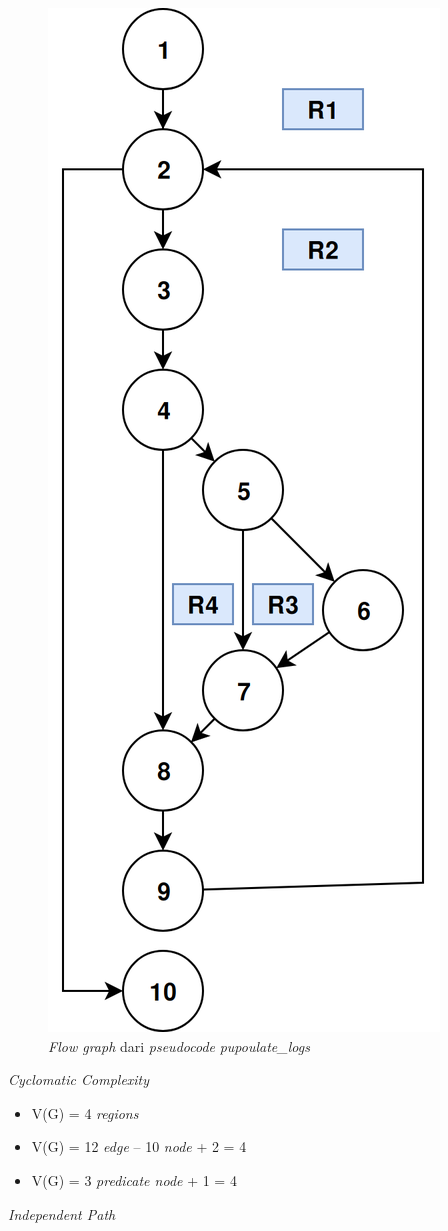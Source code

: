 \begin{figure}[H]
  \centering
  \includegraphics[width=.3\linewidth]{img/test-case/populate-logs}
  \caption{\emph{Flow graph} dari \emph{pseudocode}
    \emph{pupoulate\_logs}}\label{fg:populate_logs}
\end{figure}

\noindent
\emph{Cyclomatic Complexity}

\begin{itemize}
\item V(G) = 4 \emph{regions}
\item V(G) = 12 \emph{edge} – 10 \emph{node} + 2 = 4
\item V(G) = 3 \emph{predicate node} + 1 = 4
\end{itemize}

\noindent
\emph{Independent Path}

